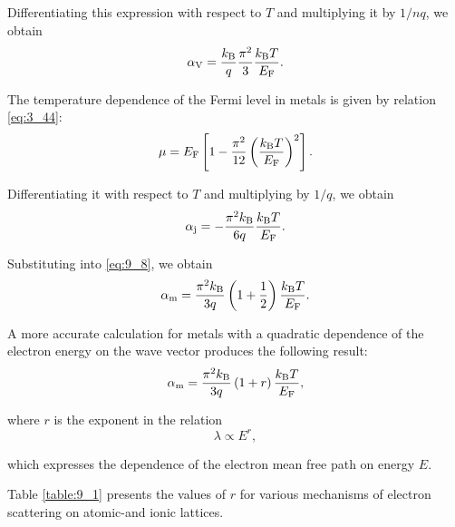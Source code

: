 \noindent
Differentiating this expression with respect to $T$ and multiplying it by $1/nq$, we obtain
\begin{equation}\label{eq:9_9}
    \alpha_{\text{V}} = \frac{k_{\text{B}}}{q} \frac{\pi^2}{3} \frac{k_{\text{B}}T}{E_{\text{F}}}.
\end{equation}

The temperature dependence of the Fermi level in metals is given by relation \eqref{eq:3_44}:
\begin{equation*}
    \mu = E_{\text{F}} \left[1 - \frac{\pi^2}{12} \left(\frac{k_{\text{B}}T}{E_{\text{F}}}\right)^2\right].
\end{equation*}

\noindent
Differentiating it with respect to $T$ and multiplying by $1/q$, we obtain
\begin{equation}\label{eq:9_10}
    \alpha_{\text{j}} = - \frac{\pi^2 k_{\text{B}}}{6q} \frac{k_{\text{B}}T}{E_{\text{F}}}.
\end{equation}

\noindent
Substituting  into \eqref{eq:9_8}, we obtain
\begin{equation}\label{eq:9_11}
    \alpha_{\text{m}} = \frac{\pi^2 k_{\text{B}}}{3q} \left(1 + \frac{1}{2}\right) \frac{k_{\text{B}}T}{E_{\text{F}}}.
\end{equation}

A more accurate calculation for metals with a quadratic dependence of the electron energy on the wave vector produces the following result:
\begin{equation}\label{eq:9_12}
    \alpha_{\text{m}} = \frac{\pi^2 k_{\text{B}}}{3q} \left(1+r\right) \frac{k_{\text{B}}T}{E_{\text{F}}},
\end{equation}

\noindent
where $r$ is the exponent in the relation
\begin{equation}\label{eq:9_13}
    \lambda \propto E^r,
\end{equation}

\noindent
which expresses the dependence of the electron mean free path on energy $E$.

Table \ref{table:9_1} presents the values of $r$ for various mechanisms of electron scattering on atomic-and ionic lattices.

